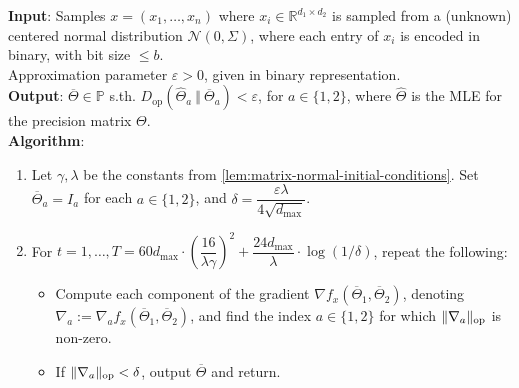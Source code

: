 \documentclass[aos]{imsart}
\theoremstyle{definition}
\numberwithin{equation}{section}
\DeclareMathOperator{\op}{op}
\DeclarePairedDelimiter{\norm}{\lVert}{\rVert}
\newcommand{\R}{{\mathbb{R}}}
\newcommand{\otheta}{\overline{\Theta}}
\newcommand{\htheta}{\widehat{\Theta}}
\newcommand{\eps}{\varepsilon}
\newcommand{\cN}{\mathcal{N}}
\newcommand{\SPD}{\mathbb{P}}
\newcommand{\samp}{x}
\newcommand{\Dop}{D_{\operatorname{op}}}
\def\dmax{d_{\max}}
\begin{document}



\begin{Algorithm}
\textbf{Input}: Samples $\samp = (\samp_1, \ldots, \samp_n)$ where $\samp_i \in \R^{d_1 \times d_2}$ is sampled from a (unknown) centered normal distribution $\cN(0, \Sigma)$, where each entry of $\samp_i$ is encoded in binary, with bit size $\le b$. \\
Approximation parameter $\eps > 0$, given in binary representation. \\[.3ex]

\textbf{Output}: $\otheta \in \SPD$ s.th. $\Dop(\htheta_a \ \Vert  \  \otheta_a) < \eps$, for $a \in \{1,2\}$, where $\htheta$ is the MLE for the precision matrix $\Theta$. \\[.3ex]

\textbf{Algorithm}:
\begin{enumerate}
\item\label{it:flip-flop step 1 matrix} Let $\gamma, \lambda$ be the constants from \cref{lem:matrix-normal-initial-conditions}. Set $\otheta_a = I_a$ for each $a \in \{1,2\}$, and $\delta = \dfrac{\eps \lambda}{4 \sqrt{\dmax}}$.

\vspace{5pt}

\item\label{it:flip-flop step 2 matrix} For $t=1,\dots,T = 60 \dmax \cdot \left( \dfrac{16}{\lambda \gamma} \right)^2 + \dfrac{24 \dmax}{\lambda} \cdot \log(1/\delta)$, repeat the following:

\vspace{5pt}

\begin{itemize}
\item Compute each component of the gradient $\nabla f_{\samp}(\otheta_1, \otheta_2)$, denoting $\nabla_a := \nabla_a f_{\samp}(\otheta_1, \otheta_2)$, and find the index $a \in \{1,2\}$ for which $\norm{\nabla_a}_{\op}$ is non-zero.

\vspace{5pt}

\item
If $\norm{\nabla_a}_{\op} < \delta$, output $\otheta$ and return.


\end{itemize}
\end{enumerate}
\end{Algorithm}
\end{document}
